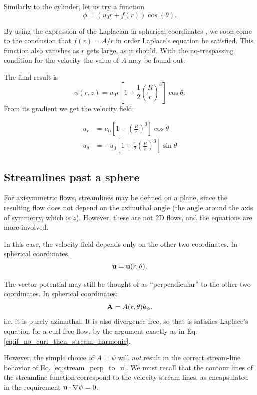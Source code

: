Similarly to the cylinder, let us try a function
\[
\phi =  \left( u_0 r  + f(r) \right) \cos(\theta)  .
\]

By using the expression of the Laplacian in spherical coordinates
\cite{wiki:del}, we soon come to the conclusion that $f(r)= A/r $ in
order Laplace's equation be satisfied. This function also vanishes as
$r$ gets large, as it should. With the no-trespassing condition for the
velocity the value of $A$ may be found out.

The final result is
\[
  \phi(r,z) = u_0 r
  \left[
    1 +
    \frac12 \left( \frac{R}{r}\right)^3
  \right] \cos\theta .
\]
From its gradient we get the velocity field:

\begin{align*}
u_r &=  u_0
  \left[
    1 -
      \left(\frac{R}{r}\right)^3
  \right] \cos\theta \\
u_\theta &=  -u_0
  \left[
    1 + \frac12
      \left(\frac{R}{r}\right)^3
  \right] \sin\theta
\end{align*}


\subsection{Streamlines past a sphere}

For axisymmetric flows, streamlines may be defined on a plane, since
the resulting flow does not depend on the azimuthal angle (the angle
around the axis of symmetry, which is $z$). However, these are not 2D
flows, and the equations are more involved.

In this case, the velocity field depends only on the other two
coordinates. In spherical coordinates,
\[
  \mathbf{u} = \mathbf{u}(r,\theta) .
\]

The vector potential may still be thought of as ``perpendicular'' to the other
two coordinates. In spherical coordinates:
\[
  \mathbf{A} = A(r,\theta)  \hat{\mathbf{e}}_\phi ,
\]
i.e. it is purely azimuthal. It is also divergence-free, so that is
satisfies Laplace's equation for a curl-free flow, by the argument
exactly as in Eq. \ref{eq:if_no_curl_then_stream_harmonic}.

However, the simple choice of $A=\psi$ will \emph{not} result in the correct
stream-line behavior of Eq.  \ref{eq:stream_perp_to_u}. We must recall
that the contour lines of the streamline function correspond
to the velocity stream lines, as encapsulated in
the requirement $\mathbf{u}\cdot\nabla\psi =0$.


